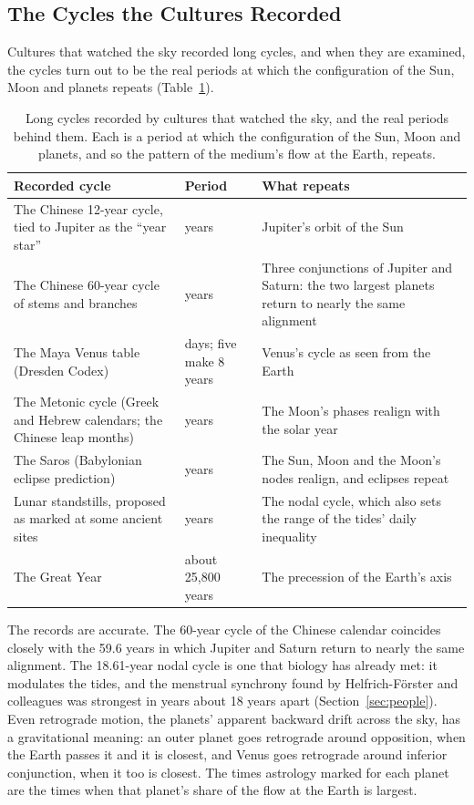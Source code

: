 \documentclass[11pt,a4paper]{article}
\begin{document}
\subsection*{The Cycles the Cultures Recorded}

Cultures that watched the sky recorded long cycles, and when they are examined, the cycles turn out to be the real periods at which the configuration of the Sun, Moon and planets repeats (Table~\ref{tab:cycles}).

\begin{table}[tb]
\centering
\small
\renewcommand{\arraystretch}{1.25}
\begin{tabular}{@{}>{\raggedright\arraybackslash}p{}>{\raggedright\arraybackslash}p{}>{\raggedright\arraybackslash}p{}@{}}
\toprule
\textbf{Recorded cycle} & \textbf{Period} & \textbf{What repeats} \\
\midrule
The Chinese 12-year cycle, tied to Jupiter as the ``year star'' & 11.86 years & Jupiter's orbit of the Sun \\
The Chinese 60-year cycle of stems and branches & 59.6 years & Three conjunctions of Jupiter and Saturn: the two largest planets return to nearly the same alignment \\
The Maya Venus table (Dresden Codex) & 584 days; five make 8 years & Venus's cycle as seen from the Earth \\
The Metonic cycle (Greek and Hebrew calendars; the Chinese leap months) & 19 years & The Moon's phases realign with the solar year \\
The Saros (Babylonian eclipse prediction) & 18.03 years & The Sun, Moon and the Moon's nodes realign, and eclipses repeat \\
Lunar standstills, proposed as marked at some ancient sites & 18.61 years & The nodal cycle, which also sets the range of the tides' daily inequality \\
The Great Year & about 25,800 years & The precession of the Earth's axis \\
\bottomrule
\end{tabular}
\caption{Long cycles recorded by cultures that watched the sky, and the real periods behind them. Each is a period at which the configuration of the Sun, Moon and planets, and so the pattern of the medium's flow at the Earth, repeats.}
\label{tab:cycles}
\end{table}

The records are accurate. The 60-year cycle of the Chinese calendar coincides closely with the 59.6 years in which Jupiter and Saturn return to nearly the same alignment. The 18.61-year nodal cycle is one that biology has already met: it modulates the tides, and the menstrual synchrony found by Helfrich-F\"orster and colleagues was strongest in years about 18 years apart (Section~\ref{sec:people}). Even retrograde motion, the planets' apparent backward drift across the sky, has a gravitational meaning: an outer planet goes retrograde around opposition, when the Earth passes it and it is closest, and Venus goes retrograde around inferior conjunction, when it too is closest. The times astrology marked for each planet are the times when that planet's share of the flow at the Earth is largest.
\end{document}
